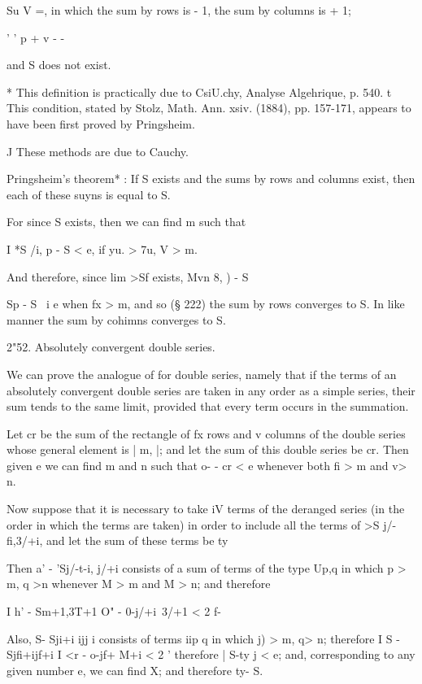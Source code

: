Su V =, in which the sum by rows is - 1, the sum by columns is + 1;

' ' p + v - -

and S does not exist.

* This definition is practically due to CsiU.chy, Analyse Algehrique,
p. 540. t This condition, stated by Stolz, Math. Ann. xsiv. (1884),
pp. 157-171, appears to have been first proved by Pringsheim.

J These methods are due to Cauchy.

%
%

Pringsheim's theorem* : If S exists and the sums by rows and columns
exist, then each of these suyns is equal to S.

For since S exists, then we can find m such that

I *S /i, p - S < e, if yu. > 7u, V > m.

And therefore, since lim >Sf exists, Mvn 8, ) - S %

  Sp - S \ i e when fx > m, and so (§ 222) the sum by rows converges
to S. In like manner the sum by cohimns converges to S.

2"52. Absolutely convergent double series.

We can prove the analogue of  for double series, namely that if
the terms of an absolutely convergent double series are taken in any
order as a simple series, their sum tends to the same limit, provided
that every term occurs in the summation.

Let cr be the sum of the rectangle of fx rows and v columns of the
double series whose general element is | m, |; and let the sum of
this double series be cr. Then given e we can find m and n such that
o- - cr < e whenever both fi > m and v> n.

Now suppose that it is necessary to take iV terms of the deranged
series (in the order in which the terms are taken) in order to include
all the terms of >S j/-fi,3/+i, and let the sum of these terms be ty

Then a' - 'Sj/-t-i, j/+i consists of a sum of terms of the type Up,q
in which p > m, q >n whenever M > m and M > n; and therefore

I h' - Sm+1,3T+1 O" - 0-j/+i\ 3/+1 < 2 f-

Also, S- Sji+i ijj i consists of terms iip q in which j) > m, q> n;
therefore I S - Sjfi+ijf+i I <r - o-jf+ M+i < 2 ' therefore | S-ty j <
e; and, corresponding to any given number e, we can find X; and
therefore ty- S.

